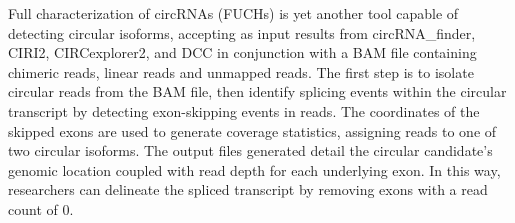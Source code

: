 \documentclass[pdflatex,sn-mathphys-num]{sn-jnl}
\begin{document}
Full characterization of circRNAs (FUCHs) \cite{FUCHS} is yet another tool capable of detecting circular isoforms, accepting as input results from  circRNA\_finder, CIRI2, CIRCexplorer2, and DCC in conjunction with a BAM file containing chimeric reads, linear reads and unmapped reads. The first step is to isolate circular reads from the BAM file, then identify splicing events within the circular transcript by detecting exon-skipping events in reads. The coordinates of the skipped exons are used to generate coverage statistics, assigning reads to one of two circular isoforms. The output files generated detail the circular candidate's genomic location coupled with read depth for each underlying exon. In this way, researchers can delineate the spliced transcript by removing exons with a read count of 0. \par
\end{document}
